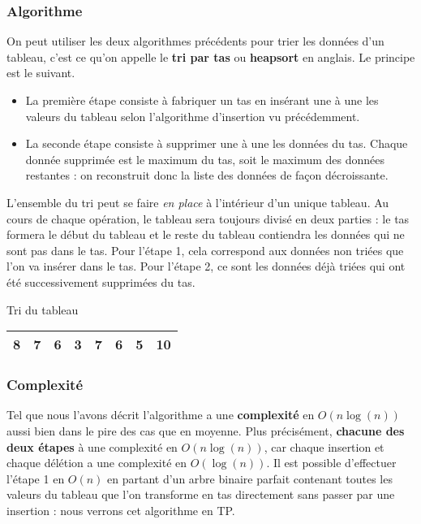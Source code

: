 \documentclass{../cours}
\begin{document}
\subsubsection{Algorithme}
On peut utiliser les deux algorithmes précédents pour trier les données d'un tableau, c'est ce qu'on appelle le \textbf{tri par tas} ou \textbf{heapsort} en anglais. Le principe est le suivant.

\begin{itemize}
\item La première étape consiste à fabriquer un tas en insérant une à une les valeurs du tableau selon l'algorithme d'insertion vu précédemment.

\item La seconde étape consiste à supprimer une à une les données du tas. Chaque donnée supprimée est le maximum du tas, soit le maximum des données restantes : on reconstruit donc la liste des données de façon décroissante.
\end{itemize}

L'ensemble du tri peut se faire \emph{en place} à l'intérieur d'un unique tableau. Au cours de chaque opération, le tableau sera toujours divisé en deux parties : le tas formera le début du tableau et le reste du tableau contiendra les données qui ne sont pas dans le tas. Pour l'étape 1, cela correspond aux données non triées que l'on va insérer dans le tas. Pour l'étape 2, ce sont les données déjà triées qui ont été successivement supprimées du tas.

\begin{Example}

Tri du tableau 

\begin{tabular}{|c|c|c|c|c|c|c|c|}
\hline
8 &  7 & 6 & 3 & 7 & 6 & 5 & 10\\
\hline
\end{tabular}

\vspace{0.5cm}


\end{Example}

\subsubsection{Complexité}

Tel que nous l'avons décrit l'algorithme a une \textbf{complexité} en $O(n\log(n))$ aussi bien dans le pire des cas que en moyenne. Plus précisément,  \textbf{chacune des deux étapes} à une complexité en $O(n \log(n))$, car chaque insertion et chaque délétion a une complexité en $O(\log(n))$. Il est possible d'effectuer l'étape 1 en $O(n)$ en partant d'un arbre binaire parfait contenant toutes les valeurs du tableau que l'on transforme en tas directement sans passer par une insertion : nous verrons cet algorithme en TP.
\end{document}
